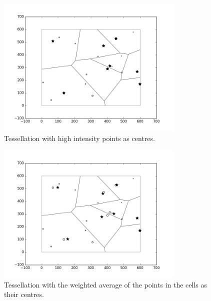 \begin{figure}[H]
  \centering
  \includegraphics[width=0.8\textwidth]{Images/recentre1.png}
  \caption{Tessellation with high intensity points as centres.}
  \label{fig:recen1}
\end{figure}
\begin{figure}[H]
  \centering
  \includegraphics[width=0.8\textwidth]{Images/recentre2.png}
  \caption{Tessellation with the weighted average of the points in the cells as their centres.}
  \label{fig:recen2}
\end{figure}